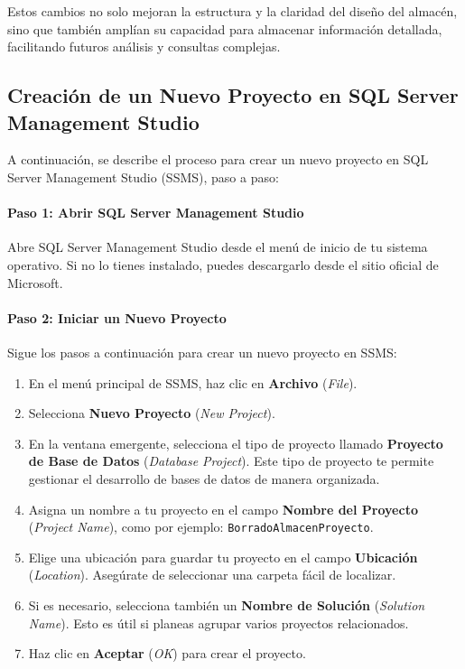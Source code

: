 \documentclass{article}
\begin{document}
	Estos cambios no solo mejoran la estructura y la claridad del diseño del almacén, sino que también amplían su capacidad para almacenar información detallada, facilitando futuros análisis y consultas complejas.
	
	
	\subsection{Creación de un Nuevo Proyecto en SQL Server Management Studio}
	
	A continuación, se describe el proceso para crear un nuevo proyecto en SQL Server Management Studio (SSMS), paso a paso:
	
	\paragraph{Paso 1: Abrir SQL Server Management Studio}  
	Abre SQL Server Management Studio desde el menú de inicio de tu sistema operativo. Si no lo tienes instalado, puedes descargarlo desde el sitio oficial de Microsoft.
	
	\paragraph{Paso 2: Iniciar un Nuevo Proyecto}  
	Sigue los pasos a continuación para crear un nuevo proyecto en SSMS:
	\begin{enumerate}
		\item En el menú principal de SSMS, haz clic en \textbf{Archivo} (\textit{File}).
		\item Selecciona \textbf{Nuevo Proyecto} (\textit{New Project}).
		\item En la ventana emergente, selecciona el tipo de proyecto llamado \textbf{Proyecto de Base de Datos} (\textit{Database Project}). Este tipo de proyecto te permite gestionar el desarrollo de bases de datos de manera organizada.
		\item Asigna un nombre a tu proyecto en el campo \textbf{Nombre del Proyecto} (\textit{Project Name}), como por ejemplo: \texttt{BorradoAlmacenProyecto}.
		\item Elige una ubicación para guardar tu proyecto en el campo \textbf{Ubicación} (\textit{Location}). Asegúrate de seleccionar una carpeta fácil de localizar.
		\item Si es necesario, selecciona también un \textbf{Nombre de Solución} (\textit{Solution Name}). Esto es útil si planeas agrupar varios proyectos relacionados.
		\item Haz clic en \textbf{Aceptar} (\textit{OK}) para crear el proyecto.
	\end{enumerate}
	
\end{document}
